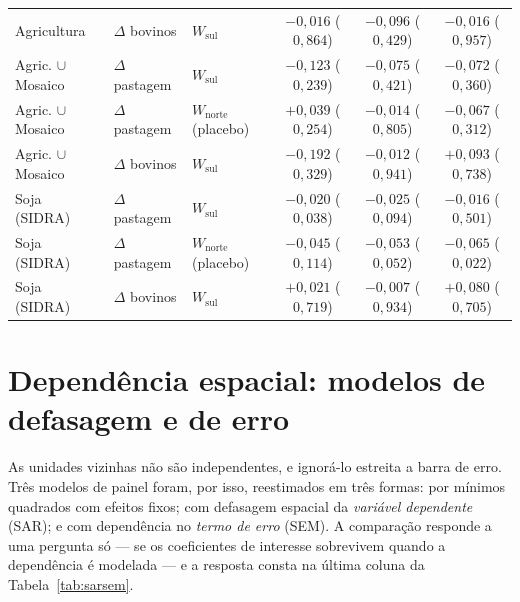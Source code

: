 \begin{table}[!ht]
\begin{tabular}{lllccc}
Agricultura & $\Delta$ bovinos & $W_{\mathrm{sul}}$ & $-0{,}016$ ($0{,}864$) & $-0{,}096$ ($0{,}429$) & $-0{,}016$ ($0{,}957$) \\
Agric. $\cup$ Mosaico & $\Delta$ pastagem & $W_{\mathrm{sul}}$ & $-0{,}123$ ($0{,}239$) & $-0{,}075$ ($0{,}421$) & $-0{,}072$ ($0{,}360$) \\
Agric. $\cup$ Mosaico & $\Delta$ pastagem & $W_{\mathrm{norte}}$ (placebo) & $+0{,}039$ ($0{,}254$) & $-0{,}014$ ($0{,}805$) & $-0{,}067$ ($0{,}312$) \\
Agric. $\cup$ Mosaico & $\Delta$ bovinos & $W_{\mathrm{sul}}$ & $-0{,}192$ ($0{,}329$) & $-0{,}012$ ($0{,}941$) & $+0{,}093$ ($0{,}738$) \\
Soja (SIDRA) & $\Delta$ pastagem & $W_{\mathrm{sul}}$ & $-0{,}020$ ($0{,}038$) & $-0{,}025$ ($0{,}094$) & $-0{,}016$ ($0{,}501$) \\
Soja (SIDRA) & $\Delta$ pastagem & $W_{\mathrm{norte}}$ (placebo) & $-0{,}045$ ($0{,}114$) & $-0{,}053$ ($0{,}052$) & $-0{,}065$ ($0{,}022$) \\
Soja (SIDRA) & $\Delta$ bovinos & $W_{\mathrm{sul}}$ & $+0{,}021$ ($0{,}719$) & $-0{,}007$ ($0{,}934$) & $+0{,}080$ ($0{,}705$) \\
\bottomrule
\end{tabular}
\end{table}

\FloatBarrier

\section{Dependência espacial: modelos de defasagem e de erro}
\label{ap:sarsem}

As unidades vizinhas não são independentes, e ignorá-lo estreita a barra de
erro. Três modelos de painel foram, por isso, reestimados em três formas: por
mínimos quadrados com efeitos fixos; com defasagem espacial da \emph{variável
dependente} (SAR); e com dependência no \emph{termo de erro} (SEM). A
comparação responde a uma pergunta só --- se os coeficientes de interesse
sobrevivem quando a dependência é modelada --- e a resposta consta na última
coluna da Tabela~\ref{tab:sarsem}.

